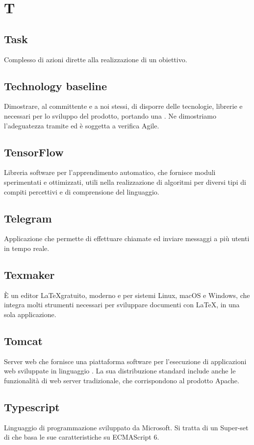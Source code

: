 \section*{T}
\markright{}

\subsection*{Task}
Complesso di azioni dirette alla realizzazione di un obiettivo.

\subsection*{Technology baseline}
Dimostrare, al committente e a noi stessi, di disporre delle tecnologie, librerie e  necessari per lo sviluppo del prodotto, portando una . Ne dimostriamo l'adeguatezza tramite  ed è soggetta a verifica Agile.

\subsection*{TensorFlow}
Libreria software  per l'apprendimento automatico, che fornisce moduli sperimentati e ottimizzati, utili nella realizzazione di algoritmi per diversi tipi di compiti percettivi e di comprensione del linguaggio.

\subsection*{Telegram}
Applicazione  che permette di effettuare chiamate ed inviare messaggi a più utenti in tempo reale.

\subsection*{Texmaker}
È un editor \LaTeX gratuito, moderno e  per sistemi Linux, macOS e Windows, che integra molti strumenti necessari per sviluppare documenti con \LaTeX, in una sola applicazione.

\subsection*{Tomcat}
Server web che fornisce una piattaforma software per l'esecuzione di applicazioni web sviluppate in linguaggio . La sua distribuzione standard include anche le funzionalità di web server tradizionale, che corrispondono al prodotto Apache. 

\subsection*{Typescript}
Linguaggio di programmazione  sviluppato da Microsoft. Si tratta di un Super-set di  che basa le sue caratteristiche su ECMAScript 6.

